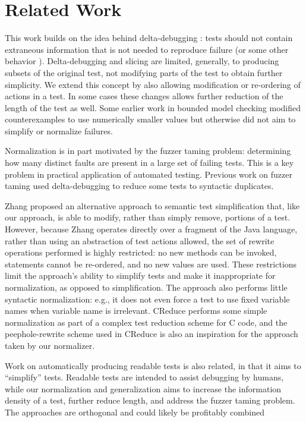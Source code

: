 \section{Related Work}

This work builds on the idea behind delta-debugging \cite{DD}: tests should not contain extraneous information that is not needed to
reproduce failure (or some other behavior \cite{icst2014,stvrcausereduce}).  Delta-debugging and slicing
\cite{TCminim} are limited, generally, to producing subsets of the
original test, not modifying parts of the test to obtain further
simplicity.  We extend this concept by also allowing modification or
re-ordering of actions in a test.  In some cases these changes
allows further reduction of the length of the test as well.  Some
earlier work in bounded model checking modified counterexamples to use
numerically smaller values \cite{MakeMost} but otherwise did not aim
to simplify or normalize failures.

Normalization is in part motivated by the fuzzer taming \cite{PLDI13}
problem: determining how many distinct faults are present in a large
set of failing tests.  This is a key problem in practical
application of automated testing.  Previous work on fuzzer taming
\cite{PLDI13} used delta-debugging to reduce some tests to
syntactic duplicates.

Zhang \cite{SaiSimple} proposed an alternative approach to semantic
test simplification that, like our approach, is able to modify, rather
than simply remove, portions of a test.  However, because Zhang
operates directly over a fragment of the Java language, rather than
using an abstraction of test actions allowed, the set of rewrite
operations performed is highly restricted: no new methods can be
invoked, statements cannot be re-ordered, and no new values are used.
These restrictions limit the approach's ability to simplify tests and
make it inappropriate for  normalization, as opposed to simplification.  The approach also performs little
syntactic normalization: e.g., it does not even force a test to use
fixed variable names when variable name is irrelevant.  CReduce
\cite{CReduce} performs some simple normalization as part of a complex
test reduction scheme for C code, and the peephole-rewrite scheme
used in CReduce is also an inspiration for the approach taken by our
normalizer.

Work on automatically producing readable tests \cite{Guava,Readable} is also
related, in that it aims to ``simplify'' tests.  Readable tests are
intended to assist debugging by humans, while our
normalization and generalization aims to increase the information
density of a test, further reduce length, and address the fuzzer taming problem.  The approaches are
orthogonal and could likely be profitably combined

